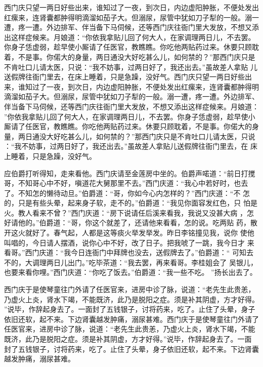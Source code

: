 西门庆只望一两日好些出来，谁知过了一夜，到次日，内边虚阳肿胀，不便处发出
红瘰来，连肾囊都肿得明滴溜如茄子大。但溺尿，尿管中犹如刀子犁的一般。溺一
遭，疼一遭。外边排军、伴当备下马伺候，还等西门庆往衙门里大发放，不想又添
出这样症候来。月娘道：“你依我拿贴儿回了何大人，在家调理两日儿，不去罢。
你身子恁虚弱，趁早使小厮请了任医官，教瞧瞧。你吃他两贴药过来。休要只顾耽
着，不是事。你偌大的身量，两日通没大好吃甚么儿，如何禁的？”那西门庆只是
不肯吐口儿请太医，只说：“我不妨事，过两日好了，我还出去。”虽故差人拿贴
儿送假牌往衙门里去，在床上睡着，只是急躁，没好气。西门庆只望一两日好些出
来，谁知过了一夜，到次日，内边虚阳肿胀，不便处发出红瘰来，连肾囊都肿得明
滴溜如茄子大。但溺尿，尿管中犹如刀子犁的一般。溺一遭，疼一遭。外边排军、
伴当备下马伺候，还等西门庆往衙门里大发放，不想又添出这样症候来。月娘道：
”你依我拿贴儿回了何大人，在家调理两日儿，不去罢。你身子恁虚弱，趁早使小
厮请了任医官，教瞧瞧。你吃他两贴药过来。休要只顾耽着，不是事。你偌大的身
量，两日通没大好吃甚么儿，如何禁的？”那西门庆只是不肯吐口儿请太医，只说
：“我不妨事，过两日好了，我还出去。”虽故差人拿贴儿送假牌往衙门里去，在
床上睡着，只是急躁，没好气。

应伯爵打听得知，走来看他。西门庆请至金莲房中坐的。伯爵声喏道：“前日打搅
哥，不知哥心中不好，嗔道花大舅那里不去。”西门庆道：“我心中若好时，也去
了。不知怎的懒待动旦。”伯爵道：“哥，你如今心内怎样的？”西门庆道：“不
怎的，只是有些头晕，起来身子软，走不的。”伯爵道：“我见你面容发红色，只
怕是火。教人看来不曾？”西门庆道：“房下说请任后溪来看我，我说又没甚大病
，怎好请他的。”伯爵道：“哥，你这个就差了，还请他来看看，怎的说。吃两贴
药，散开这火就好了。春气起，人都是这等痰火举发举发。昨日李铭撞见我，说你
使他叫唱的，今日请人摆酒，说你心中不好，改了日子。把我唬了一跳，我今日才
来看哥。”西门庆道：“我今日连衙门中拜牌也没去，送假牌去了。”伯爵道：“
可知去不的，大调理两日儿出门。”吃毕茶道：“我去罢，再来看哥。李桂姐会了
吴银儿，也要来看你哩。”西门庆道：“你吃了饭去。”伯爵道：“我一些不吃。
”扬长出去了。

西门庆于是使琴童往门外请了任医官来，进房中诊了脉，说道：“老先生此贵恙，
乃虚火上炎，肾水下竭，不能既济，此乃是脱阳之症。须是补其阴虚，方才好得。
”说毕，作辞起身去了。一面封了五钱银子，讨将药来，吃了。止住了头晕，身子
依旧还软，起不来。下边肾囊越发肿痛，溺尿甚难。西门庆于是使琴童往门外请了
任医官来，进房中诊了脉，说道：“老先生此贵恙，乃虚火上炎，肾水下竭，不能
既济，此乃是脱阳之症。须是补其阴虚，方才好得。”说毕，作辞起身去了。一面
封了五钱银子，讨将药来，吃了。止住了头晕，身子依旧还软，起不来。下边肾囊
越发肿痛，溺尿甚难。

